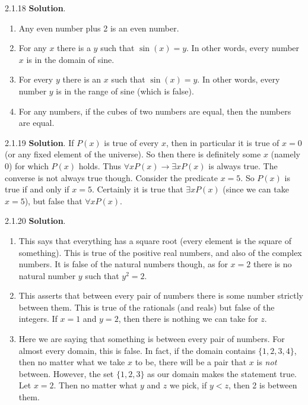 \documentclass[11pt,]{book}
\theoremstyle{ptxplainnotitle}
\theoremstyle{ptxplaintitle}
\theoremstyle{ptxdefinitionnotitle}
\theoremstyle{ptxdefinitiontitle}
\theoremstyle{ptxdefinitionnotitle}
\theoremstyle{ptxdefinitiontitle}
\theoremstyle{ptxdefinitionnotitle}
\theoremstyle{ptxdefinitiontitle}
\theoremstyle{ptxdefinitiontitlenonumber}
\theoremstyle{ptxdefinitiontitlenonumber}
\numberwithin{equation}{chapter}
\newcommand{\imp}{\rightarrow}
\newcommand{\lt}{<}
\begin{document}
\begin{divisionexercise}{2.1.18}
\textbf{Solution}.\quad%
\hypertarget{p-2336}{}%
\leavevmode%
\begin{enumerate}[label=(\alph*)]
\item\hypertarget{li-1221}{}\hypertarget{p-2337}{}%
Any even number plus 2 is an even number.%
\item\hypertarget{li-1222}{}\hypertarget{p-2338}{}%
For any \(x\) there is a \(y\) such that \(\sin(x) = y\). In other words, every number \(x\) is in the domain of sine.%
\item\hypertarget{li-1223}{}\hypertarget{p-2339}{}%
For every \(y\) there is an \(x\) such that \(\sin(x) = y\). In other words, every number \(y\) is in the range of sine (which is false).%
\item\hypertarget{li-1224}{}\hypertarget{p-2340}{}%
For any numbers, if the cubes of two numbers are equal, then the numbers are equal.%
\end{enumerate}
%
\end{divisionexercise}%
\begin{divisionexercise}{2.1.19}
\textbf{Solution}.\quad%
\hypertarget{p-2342}{}%
If \(P(x)\) is true of every \(x\), then in particular it is true of \(x = 0\) (or any fixed element of the universe). So then there is definitely some \(x\) (namely 0) for which \(P(x)\) holds. Thus \(\forall x P(x) \imp \exists x P(x)\) is always true. The converse is not always true though. Consider the predicate \(x = 5\). So \(P(x)\) is true if and only if \(x = 5\). Certainly it is true that \(\exists x P(x)\) (since we can take \(x = 5\)), but false that \(\forall x P(x)\).%
\end{divisionexercise}%
\begin{divisionexercise}{2.1.20}
\textbf{Solution}.\quad%
\hypertarget{p-2344}{}%
\leavevmode%
\begin{enumerate}[label=(\alph*)]
\item\hypertarget{li-1228}{}\hypertarget{p-2345}{}%
This says that everything has a square root (every element is the square of something). This is true of the positive real numbers, and also of the complex numbers. It is false of the natural numbers though, as for \(x = 2\) there is no natural number \(y\) such that \(y^2 = 2\).%
\item\hypertarget{li-1229}{}\hypertarget{p-2346}{}%
This asserts that between every pair of numbers there is some number strictly between them. This is true of the rationals (and reals) but false of the integers. If \(x = 1\) and \(y = 2\), then there is nothing we can take for \(z\).%
\item\hypertarget{li-1230}{}\hypertarget{p-2347}{}%
Here we are saying that something is between every pair of numbers. For almost every domain, this is false. In fact, if the domain contains \(\{1,2,3, 4\}\), then no matter what we take \(x\) to be, there will be a pair that \(x\) is \emph{not} between. However, the set \(\{1,2,3\}\) as our domain makes the statement true. Let \(x = 2\). Then no matter what \(y\) and \(z\) we pick, if \(y \lt  z\), then 2 is between them.%
\end{enumerate}
%
\end{divisionexercise}%
\end{document}

